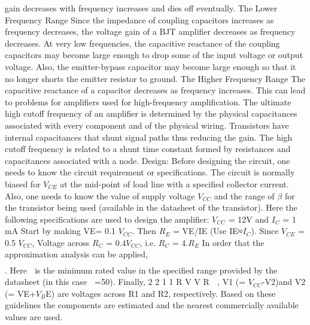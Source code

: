 gain decreases with frequency increases and dies off eventually.
The Lower Frequency Range
Since the impedance of coupling capacitors increases as frequency decreases, the voltage
gain of a BJT amplifier decreases as frequency decreases. At very low frequencies, the
capacitive reactance of the coupling capacitors may become large enough to drop some
of the input voltage or output voltage. Also, the emitter-bypass capacitor may become
large enough so that it no longer shorts the emitter resistor to ground.
The Higher Frequency Range
The capacitive reactance of a capacitor decreases as frequency increases. This can lead to
problems for amplifiers used for high-frequency amplification. The ultimate high cutoff
frequency of an amplifier is determined by the physical capacitances associated with
every component and of the physical wiring. Transistors have internal capacitances that
shunt signal paths thus reducing the gain. The high cutoff frequency is related to a shunt
time constant formed by resistances and capacitances associated with a node.
Design:
Before designing the circuit, one needs to know the circuit requirement or specifications.
The circuit is normally biased for $V_{CE}$ at the mid-point of load line with a specified
collector current. Also, one needs to know the value of supply voltage $V_{CC}$ and the range
of $\beta$ for the transistor being used (available in the datasheet of the transistor).
Here the following specifications are used to design the amplifier:
$V_{CC}$ = 12V and $I_C$ = 1 mA
Start by making VE= 0.1 $V_{CC}$. Then $R_E$ = VE/IE (Use IE≈$I_C$).
Since $V_{CE}$ = 0.5 $V_{CC}$, Voltage across $R_C$ = 0.4$V_{CC}$, i.e. $R_C$ = 4.$R_E$
In order that the approximation analysis can be applied,
\begin{align*}

\end{align*}
. Here  is the
minimum rated value in the specified range provided by the datasheet (in this
case  =50).
Finally,
2
2
1
1
R
V
V
R 
, V1 (= $V_{CC}$-V2)and V2 (= VE+$V_B$E) are voltages across R1 and R2,
respectively.
Based on these guidelines the components are estimated and the nearest commercially
available values are used.